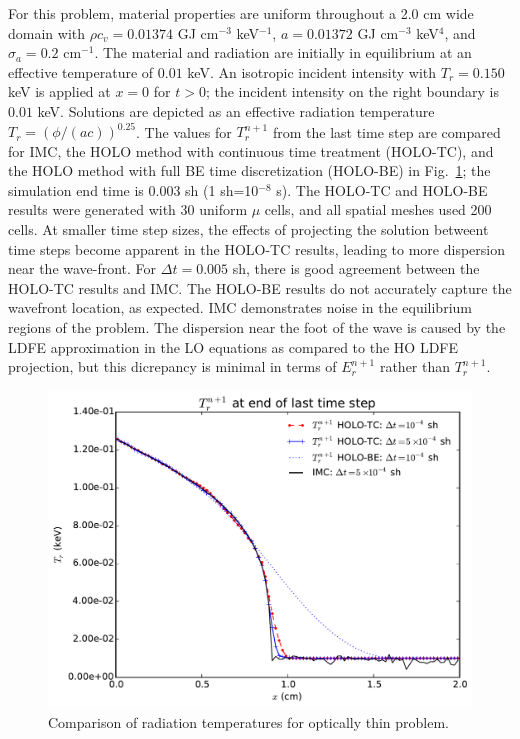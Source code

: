 \documentclass{anstrans}
\newcommand{\invcm}[0]{cm$^{-1}$}
\begin{document}
For this problem, material properties
are uniform throughout a 2.0 cm wide domain with $\rho c_v = 0.01374$ GJ cm$^{-3}$
keV$^{-1}$, $a=0.01372$ GJ cm$^{-3}$ keV$^{4}$, and $\sigma_a=0.2$ \invcm.  
The material and radiation are initially in equilibrium at an effective temperature of $0.01$ keV.
An isotropic incident intensity with $T_r = 0.150$ keV is applied
at $x=0$ for $t>0$; the incident intensity on the right boundary is $0.01$ keV.
 Solutions are depicted as an effective radiation temperature
 $T_r=\left(\phi/(ac)\right)^{0.25}$. The values for $T_r^{n+1}$ from the last
 time step are compared for IMC, the HOLO method with continuous time treatment (HOLO-TC), and
 the HOLO method with full BE time discretization (HOLO-BE) in
 Fig.~\ref{fig:thin_temp_compare}; the simulation end time is 0.003 sh (1 sh=10$^{-8}$ s). The HOLO-TC and HOLO-BE results were generated with 30
uniform $\mu$ cells, and all spatial meshes used 200 cells.  At smaller time step sizes, the
effects of projecting the solution betweent time steps become apparent in the HOLO-TC results, leading to more
dispersion near the wave-front.  For $\Delta t=0.005$ sh, there is good agreement between
the HOLO-TC results and IMC.  The HOLO-BE results do not accurately capture
the wavefront location, as expected. IMC demonstrates noise in the equilibrium
regions of the problem. The dispersion near the foot of the wave is caused by
the LDFE approximation in the LO equations as compared to the HO LDFE projection, but this dicrepancy is minimal in
terms of $E_r^{n+1}$ rather than $T_r^{n+1}$.
\begin{figure}
  \centering
    \includegraphics[width=0.92\linewidth]{thin_temp_compare.pdf}
    \caption{\label{fig:thin_temp_compare} Comparison of radiation temperatures for optically thin
        problem. }
\end{figure}
\end{document}
